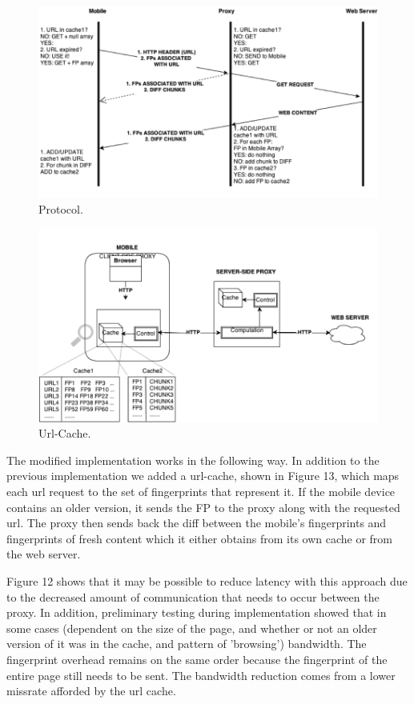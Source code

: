 \begin{figure}[h] 
\centering \includegraphics[scale=0.40]{images/urlcache-protocol.png}
\caption{Protocol. }
\end{figure} 

\begin{figure}[h] 
\centering \includegraphics[scale=0.40]{images/url-cache-hl.png}
\caption{Url-Cache. }
\end{figure} 

The modified implementation works in the following way. In addition to the previous implementation we added a url-cache, shown in Figure 13, which maps each url request to the set of fingerprints that represent it. If the mobile device contains an older version, it sends the FP to the proxy along with the requested url. The proxy then sends back the diff between the mobile's fingerprints and fingerprints of fresh content which it either obtains from its own cache or from the web server. 

Figure 12 shows that it may be possible to reduce latency with this approach due to the decreased amount of communication that needs to occur between the proxy. In addition, preliminary testing during implementation showed that in some cases (dependent on the size of the page, and whether or not an older version of it was in the cache, and pattern of 'browsing') bandwidth. The fingerprint overhead remains on the same order because the fingerprint of the entire page still needs to be sent. The bandwidth reduction comes from a lower missrate afforded by the url cache.  

